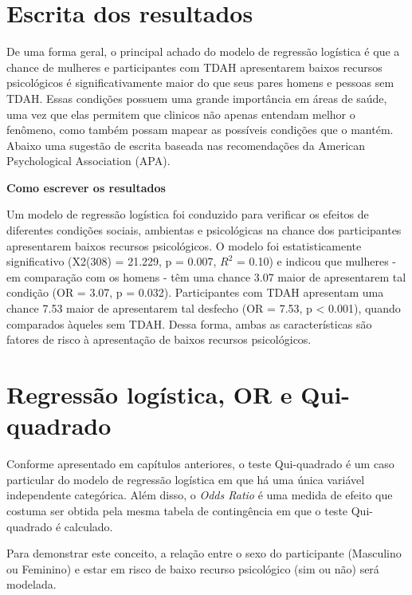 \documentclass[
]{book}
\begin{document}
\hypertarget{escrita-dos-resultados-14}{%
\section{Escrita dos resultados}\label{escrita-dos-resultados-14}}

De uma forma geral, o principal achado do modelo de regressão logística
é que a chance de mulheres e participantes com TDAH apresentarem baixos
recursos psicológicos é significativamente maior do que seus pares
homens e pessoas sem TDAH. Essas condições possuem uma grande
importância em áreas de saúde, uma vez que elas permitem que clinicos
não apenas entendam melhor o fenômeno, como também possam mapear as
possíveis condições que o mantém. Abaixo uma sugestão de escrita baseada
nas recomendações da American Psychological Association (APA).

\begin{writing}
\textbf{Como escrever os resultados}

Um modelo de regressão logística foi conduzido para verificar os efeitos
de diferentes condições sociais, ambientas e psicológicas na chance dos
participantes apresentarem baixos recursos psicológicos. O modelo foi
estatisticamente significativo (X2(308) = 21.229, p = 0.007, \(R^2\) =
0.10) e indicou que mulheres - em comparação com os homens - têm uma
chance 3.07 maior de apresentarem tal condição (OR = 3.07, p = 0.032).
Participantes com TDAH apresentam uma chance 7.53 maior de apresentarem
tal desfecho (OR = 7.53, p \textless{} 0.001), quando comparados àqueles
sem TDAH. Dessa forma, ambas as características são fatores de risco à
apresentação de baixos recursos psicológicos.
\end{writing}

\hypertarget{regressuxe3o-loguxedstica-or-e-qui-quadrado}{%
\section{Regressão logística, OR e
Qui-quadrado}\label{regressuxe3o-loguxedstica-or-e-qui-quadrado}}

Conforme apresentado em capítulos anteriores, o teste Qui-quadrado é um
caso particular do modelo de regressão logística em que há uma única
variável independente categórica. Além disso, o \emph{Odds Ratio} é uma
medida de efeito que costuma ser obtida pela mesma tabela de
contingência em que o teste Qui-quadrado é calculado.

Para demonstrar este conceito, a relação entre o sexo do participante
(Masculino ou Feminino) e estar em risco de baixo recurso psicológico
(sim ou não) será modelada.
\end{document}

